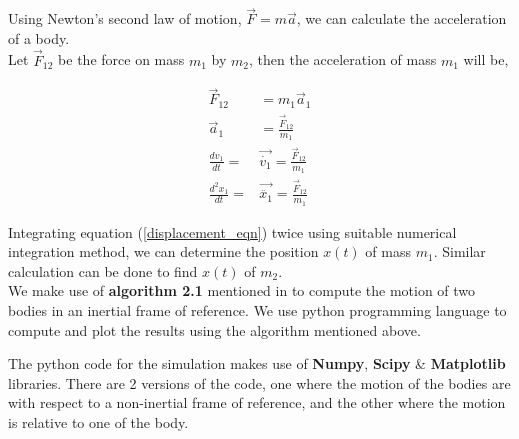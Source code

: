Using Newton's second law of motion, $\vec F=m \vec a$, we can calculate the acceleration of a body.\\

Let $\vec F_{12}$ be the force on mass $m_1$ by $m_2$, then the acceleration of mass $m_1$ will be,

\begin{equation}
    \begin{split}
        \vec F_{12} &= m_{1}\vec a_1\\
        \vec a_1 &= \frac{\vec F_{12}}{m_1}\\
        \frac{dv_1}{dt} ={} &{} \vec{\dot{v_1}} = \frac{\vec F_{12}}{m_1}\\
        \frac{d^2x_1}{dt} ={} &{} \vec{\ddot {x_1}} = \frac{\vec F_{12}}{m_1} \label{displacement_eqn}
    \end{split}
\end{equation}

Integrating equation (\ref{displacement_eqn}) twice using suitable numerical integration method, we can determine the position $x(t)$ of mass $m_1$. Similar calculation can be done to find $x(t)$ of $m_2$.\\

We make use of \textbf{algorithm 2.1} mentioned in \textcite{orbital_mechanics_4ed} to compute the motion of two bodies in an inertial frame of reference. We use python programming language to compute and plot the results using the algorithm mentioned above.

The python code for the simulation makes use of \textbf{Numpy}, \textbf{Scipy} \& \textbf{Matplotlib} libraries. There are 2 versions of the code, one where the motion of the bodies are with respect to a non-inertial frame of reference, and the other where the motion is relative to one of the body.
